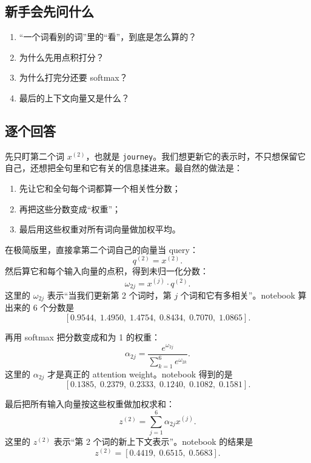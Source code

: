 \documentclass[11pt,a4paper]{ctexart}
\begin{document}
\subsection{新手会先问什么}

\begin{enumerate}
  \item “一个词看别的词”里的“看”，到底是怎么算的？
  \item 为什么先用点积打分？
  \item 为什么打完分还要 softmax？
  \item 最后的上下文向量又是什么？
\end{enumerate}

\subsection{逐个回答}

\begin{intuitionblock}
先只盯第二个词 \(x^{(2)}\)，也就是 \texttt{journey}。我们想更新它的表示时，不只想保留它自己，还想把全句里和它有关的信息揉进来。最自然的做法是：
\begin{enumerate}
  \item 先让它和全句每个词都算一个相关性分数；
  \item 再把这些分数变成“权重”；
  \item 最后用这些权重对所有词向量做加权平均。
\end{enumerate}
\end{intuitionblock}

\begin{mathblock}
在极简版里，直接拿第二个词自己的向量当 query：
\[
q^{(2)} = x^{(2)}.
\]
然后算它和每个输入向量的点积，得到未归一化分数：
\[
\omega_{2j} = x^{(j)} \cdot q^{(2)}.
\]
这里的 \(\omega_{2j}\) 表示“当我们更新第 2 个词时，第 \(j\) 个词和它有多相关”。notebook 算出来的 6 个分数是
\[
[0.9544,\; 1.4950,\; 1.4754,\; 0.8434,\; 0.7070,\; 1.0865].
\]

再用 softmax 把分数变成和为 1 的权重：
\[
\alpha_{2j}
=
\frac{e^{\omega_{2j}}}{\sum_{k=1}^{6} e^{\omega_{2k}}}.
\]
这里的 \(\alpha_{2j}\) 才是真正的 attention weight。notebook 得到的是
\[
[0.1385,\; 0.2379,\; 0.2333,\; 0.1240,\; 0.1082,\; 0.1581].
\]

最后把所有输入向量按这些权重做加权求和：
\[
z^{(2)}
=
\sum_{j=1}^{6} \alpha_{2j} x^{(j)}.
\]
这里的 \(z^{(2)}\) 表示“第 2 个词的新上下文表示”。notebook 的结果是
\[
z^{(2)} = [0.4419,\; 0.6515,\; 0.5683].
\]
\end{mathblock}
\end{document}
